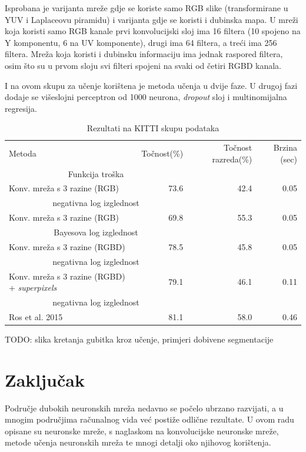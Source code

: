 \documentclass[times, utf8, diplomski, numeric]{fer}
\begin{document}
Isprobana je varijanta mreže gdje se koriste samo RGB slike (transformirane u YUV i Laplaceovu piramidu) i varijanta gdje se koristi i dubinska mapa. U mreži koja koristi samo RGB kanale prvi konvolucijski sloj ima 16 filtera (10 spojeno na Y komponentu, 6 na UV komponente), drugi ima 64 filtera, a treći ima 256 filtera.
Mreža koja koristi i dubinsku informaciju ima jednak raspored filtera, osim što su u prvom sloju svi filteri spojeni na svaki od četiri RGBD kanala.

I na ovom skupu za učenje korištena je metoda učenja u dvije faze. U drugoj fazi dodaje se višeslojni perceptron od 1000 neurona, \textit{dropout} sloj i multinomijalna regresija.

\begin{table}
\centering
\begin{tabular}{l r r r}
  Metoda & Točnost(\%) & Točnost razreda(\%) & Brzina (sec) \\
    \multicolumn{2}{c}{Funkcija troška} & & \\[0.6em] \hline

  Konv. mreža s 3 razine (RGB) & 73.6 & 42.4 & 0.05 \\
    \multicolumn{2}{c}{negativna log izglednost} & & \\ \hline
  Konv. mreža s 3 razine (RGB) & 69.8 & 55.3 & 0.05 \\
    \multicolumn{2}{c}{Bayesova log izglednost} & & \\ \hline
  Konv. mreža s 3 razine (RGBD) & 78.5 & 45.8 & 0.05 \\
    \multicolumn{2}{c}{negativna log izglednost} & & \\ \hline
  Konv. mreža s 3 razine (RGBD) + \textit{superpixels} & 79.1 & 46.1 & 0.11 \\
    \multicolumn{2}{c}{negativna log izglednost} & & \\ \hline \hline
  Ros et al.\cite{ros:2015} 2015 & 81.1 & 58.0 & 0.46
\end{tabular}
\caption{Rezultati na KITTI skupu podataka}
\end{table}

TODO: slika kretanja gubitka kroz učenje, primjeri dobivene segmentacije

\chapter{Zaključak}

Područje dubokih neuronskih mreža nedavno se počelo ubrzano razvijati, a u mnogim područjima računalnog vida već postiže odlične rezultate. U ovom radu opisane su neuronske mreže, s naglaskom na konvolucijske neuronske mreže, metode učenja neuronskih mreža te mnogi detalji oko njihovog korištenja.
\end{document}
